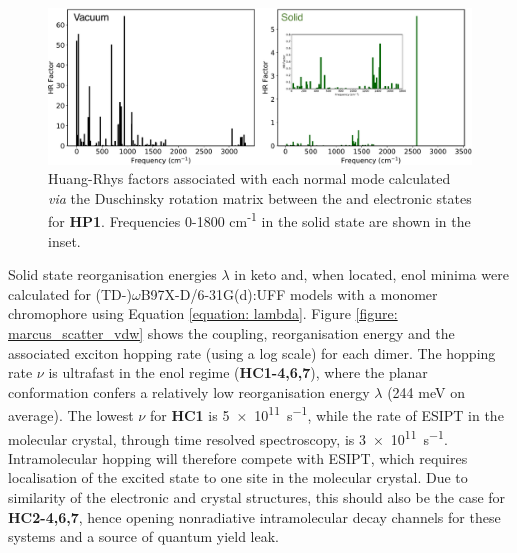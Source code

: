 \begin{figure}[H]
\centering
  \includegraphics[width=0.9\linewidth]{5ConnectingCrystalStructure/HP1_DUSHIN.pdf}
  \caption[Huang-Rhys factors for \textbf{HP1}]{Huang-Rhys factors associated with each normal mode calculated \textit{via} the Duschinsky rotation matrix between the \szero{} and \Kstar{} \sone{} electronic states for \textbf{HP1}. Frequencies 0-1800 cm\textsuperscript{-1} in the solid state are shown in the inset.}
  \label{figure: HP1_DUSHIN}
\end{figure}
Solid state reorganisation energies $\lambda$ in keto and, when located, enol minima were calculated for (TD-)$\omega$B97X-D/6-31G(d):UFF models with a monomer chromophore using Equation \ref{equation: lambda}. Figure \ref{figure: marcus_scatter_vdw} shows the coupling, reorganisation energy and the associated exciton hopping rate (using a log scale) for each dimer. The hopping rate $\nu$ is ultrafast in the enol regime (\textbf{HC1-4,6,7}), where the planar conformation confers a relatively low reorganisation energy $\lambda$ (244 meV on average). The lowest $\nu$ for \textbf{HC1} is \SI{5e11}{s^{-1}}, while the rate of ESIPT in the molecular crystal, through time resolved spectroscopy, is \SI{3e11}{s^{-1}}.\cite{Zahid2017} Intramolecular hopping will therefore compete with ESIPT, which requires localisation of the excited state to one site in the molecular crystal. Due to similarity of the electronic and crystal structures, this should also be the case for \textbf{HC2-4,6,7}, hence opening nonradiative intramolecular decay channels for these systems and a source of quantum yield leak.

